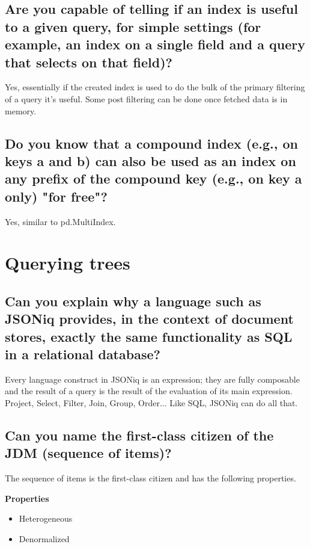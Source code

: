 \documentclass{article}
\begin{document}
\subsection{Are you capable of telling if an index is useful to a given query, for simple settings (for example, an index on a single field and a query that selects on that field)?}

Yes, essentially if the created index is used to do the bulk of the primary filtering of a query it's useful. Some post filtering can be done once fetched data is in memory.

\subsection{Do you know that a compound index (e.g., on keys a and b) can also be used as an index on any prefix of the compound key (e.g., on key a only) "for free"?}

Yes, similar to pd.MultiIndex.



\section{Querying trees}
\subsection{Can you explain why a language such as JSONiq provides, in the context of document stores, exactly the same functionality as SQL in a relational database?}

Every language construct in JSONiq is an expression; they are fully composable and the result of a query is the result of the evaluation of its main expression. Project, Select, Filter, Join, Group, Order... Like SQL, JSONiq can do all that.

\subsection{Can you name the first-class citizen of the JDM (sequence of items)?}

The sequence of items is the first-class citizen and has the following properties. 
 
\textbf{Properties} 
\begin{itemize}
    \item Heterogeneous
    \item Denormalized
\end{itemize}
\end{document}

